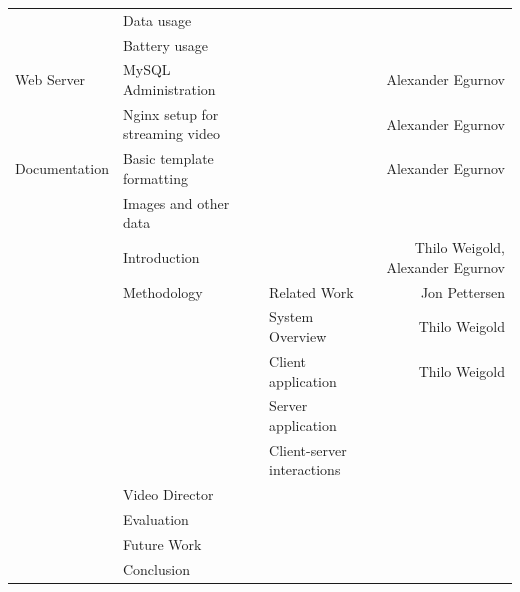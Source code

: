 \documentclass[conference]{IEEEtran}
\begin{document}
\begin{table}[t]
\begin{tabular}{lllr}
			& Data usage & & \\
			& Battery usage & & \\
		\midrule
		Web Server
			& MySQL Administration & & Alexander Egurnov \\
			& Nginx setup for streaming video & & Alexander Egurnov \\
		\midrule
		Documentation 
			& Basic template formatting & & Alexander Egurnov \\
			& Images and other data & & \\
			& Introduction & & Thilo Weigold, Alexander Egurnov \\
			& Methodology & Related Work & Jon Pettersen \\
			&       & System Overview & Thilo Weigold \\
			&		& Client application & Thilo Weigold \\
			&		& Server application & \\
			&		& Client-server interactions & \\
			& Video Director & & \\
			& Evaluation & & \\
			& Future Work & & \\
			& Conclusion & & \\
		\bottomrule
    \end{tabular}%
\end{table}%

\vfill
\end{document}
